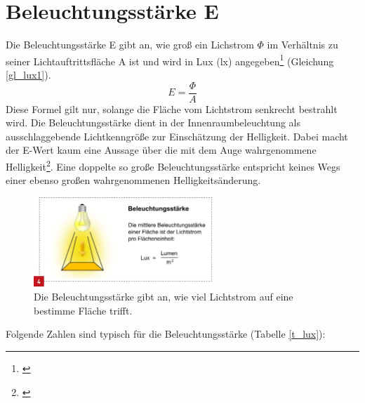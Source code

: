 \section{Beleuchtungsstärke E}\label{sec_lux}
Die Beleuchtungsstärke E gibt an, wie groß ein Lichstrom $\Phi$ im Verhältnis zu seiner Lichtauftrittsfläche A ist  und wird in Lux (lx) angegeben\footnote{\cite[28]{ris}} (Gleichung \ref{gl_lux1}).
 \begin{equation}\label{gl_lux1}
	E=\frac{\Phi}{A}	
\end{equation}
Diese Formel gilt nur, solange die Fläche vom Lichtstrom senkrecht bestrahlt wird. Die Beleuchtungsstärke dient in der Innenraumbeleuchtung als ausschlaggebende Lichtkenngröße zur Einschätzung der Helligkeit. Dabei macht der E-Wert kaum eine Aussage über die mit dem Auge wahrgenommene Helligkeit\footnote{\cite[29]{ris}}. Eine doppelte so große Beleuchtungsstärke entspricht keines Wegs einer ebenso großen wahrgenommenen Helligkeitsänderung.

\begin{figure}[H]     %
\centering
\includegraphics[width=0.6\textwidth]{bilder/lux} 
\caption {Die Beleuchtungsstärke gibt an, wie viel Lichtstrom auf eine bestimme Fläche trifft\protect\footnotemark.}\label{b_lux}
\end{figure}

\newpage
\noindent Folgende Zahlen sind typisch für die Beleuchtungsstärke (Tabelle \ref{t_lux}):

